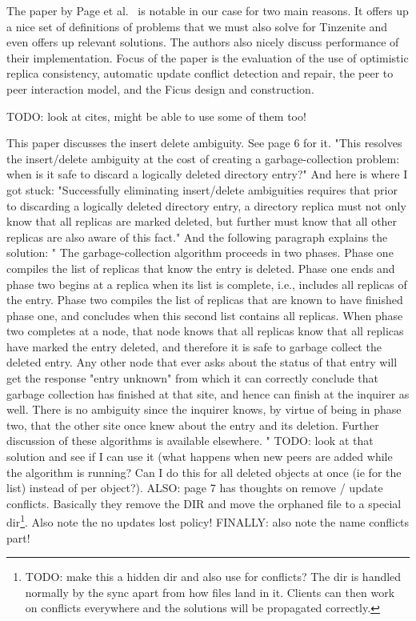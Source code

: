 The paper by Page et al.~\cite{page1998perspectives} is notable in our case for two main reasons.
It offers up a nice set of definitions of problems that we must also solve for Tinzenite and even offers up relevant solutions.
The authors also nicely discuss performance of their implementation.
Focus of the paper is the evaluation of the use of optimistic replica consistency, automatic update conflict detection and repair, the peer to peer interaction model, and the Ficus design and construction.

TODO: look at cites, might be able to use some of them too!

This paper discusses the insert delete ambiguity.
See page 6 for it.
"This resolves the insert/delete ambiguity at the cost of creating a garbage-collection problem: when is it safe to discard a logically deleted directory entry?"
And here is where I got stuck: "Successfully eliminating insert/delete ambiguities requires that prior to discarding a logically deleted directory entry, a directory replica must not only know that all replicas are marked deleted, but further must know that all other replicas are also aware of this fact."
And the following paragraph explains the solution: "
The garbage-collection algorithm proceeds in two phases.
Phase one compiles the list of replicas that know the entry is deleted.
Phase one ends and phase two begins at a replica when its list is complete, i.e., includes all replicas of the entry.
Phase two compiles the list of replicas that are known to have finished phase one, and concludes when this second list contains all replicas.
When phase two completes at a node, that node knows that all replicas know that all replicas have marked the entry deleted, and therefore it is safe to garbage collect the deleted entry.
Any other node that ever asks about the status of that entry will get the response "entry unknown" from which it can correctly conclude that garbage collection has finished at that site, and hence can finish at the inquirer as well.
There is no ambiguity since the inquirer knows, by virtue of being in phase two, that the other site once knew about the entry and its deletion.
Further discussion of these algorithms is available elsewhere.
"
TODO: look at that solution and see if I can use it (what happens when new peers are added while the algorithm is running? Can I do this for all deleted objects at once (ie for the list) instead of per object?).
ALSO: page 7 has thoughts on remove / update conflicts.
Basically they remove the DIR and move the orphaned file to a special dir\footnote{TODO: make this a hidden dir and also use for conflicts? The dir is handled normally by the sync apart from how files land in it. Clients can then work on conflicts everywhere and the solutions will be propagated correctly.}.
Also note the no updates lost policy!
FINALLY: also note the name conflicts part!

